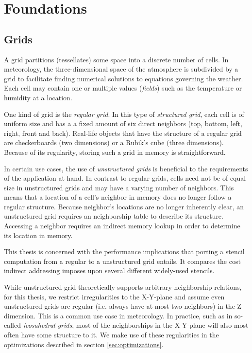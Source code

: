 \section{Foundations}									\label{sec:foundations}

\subsection{Grids}											\label{sec:grids}

A grid partitions (tessellates) some space into a discrete number of cells. In meteorology, the three-dimensional space of the atmosphere is subdivided by a grid to facilitate finding numerical solutions to equations governing the weather. Each cell may contain one or multiple values (\emph{fields}) such as the temperature or humidity at a location.

One kind of grid is the \emph{regular grid}. In this type of \emph{structured grid}, each cell is of uniform size and has a a fixed amount of six direct neighbors (top, bottom, left, right, front and back). Real-life objects that have the structure of a regular grid are checkerboards (two dimensions) or a Rubik's cube (three dimensions). Because of its regularity, storing such a grid in memory is straightforward.

In certain use cases, the use of \emph{unstructured grids} is beneficial to the requirements of the application at hand. In contrast to regular grids, cells need not be of equal size in unstructured grids and may have a varying number of neighbors. This means that a location of a cell's neighbor in memory does no longer follow a regular structure. Because neighbor's locations are no longer inherently clear, an unstructured grid requires an neighborship table to describe its structure. Accessing a neighbor requires an indirect memory lookup in order to determine its location in memory.

This thesis is concerned with the performance implications that porting a stencil computation from a regular to a unstructured grid entails. It compares the cost indirect addressing imposes upon several different widely-used stencils.

While unstructured grid theoretically supports arbitrary neighborship relations, for this thesis, we restrict irregularities to the X-Y-plane and assume even unstructured grids are regular (i.e. always have at most two neighbors) in the Z-dimension. This is a common use case in meteorology. In practice, such as in so-called \emph{icosahedral grids}, most of the neighborships in the X-Y-plane will also most often have some structure to it. We make use of these regularities in the optimizations described in section \ref{sec:optimizations}.


